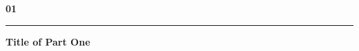 \documentclass[aspectratio=169,10pt,xcolor=table]{beamer}
\begin{document}
\begin{frame}[plain,t]
\vspace*{0.18\paperheight}
{\fontsize{100}{100}\selectfont\bfseries\textcolor{black!8}{01}\par}
\vspace{-12mm}
\textcolor{maincolor}{\rule{12mm}{4mm}}\par
\vspace{8pt}
{\fontsize{20}{24}\selectfont\bfseries\textcolor{maincolor}{Title of Part One}\par}
\end{frame}
\end{document}
